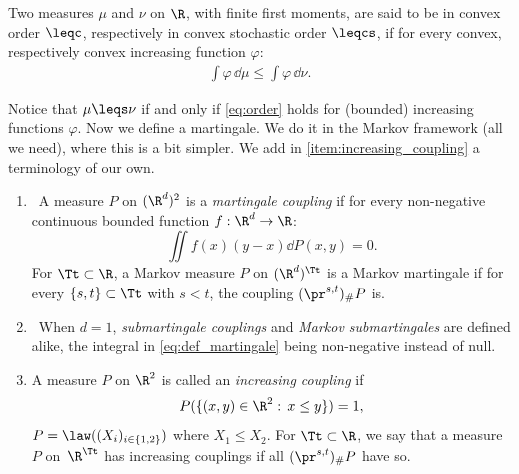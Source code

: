 \begin{defi}\label{defi:leqc}Two measures $\mu$ and $\nu$ on $\R$, with finite first moments, are said to be in convex order $\leqc$, respectively in convex stochastic order $\leqcs$, if for every convex, respectively convex increasing function $\varphi$:
\begin{align}\label{eq:order}
\int \varphi\, \dd \mu\leq \int \varphi\, \dd \nu.
\end{align}
\end{defi}

Notice that $\mu\leqs\nu$ if and only if \eqref{eq:order} holds for (bounded) increasing functions $\varphi$. Now we define a martingale. We do it in the Markov framework (all we need), where this is a bit simpler. We add in \eqref{item:increasing_coupling} a terminology of our own.

\skpt
\begin{defi}\label{defi:martingale}
\begin{enumerate}
\item
\label{item:martingale}\ A measure $P$ on $(\R^d)^2$ is a \emph{martingale coupling} if for every non-negative continuous bounded function $f:\R^d\to \R$:
\begin{equation}\label{eq:def_martingale}\iint f(x)(y-x) \dd P(x,y)=0.
\end{equation}
For $\Tt\subset\R$, a Markov measure $P$ on $(\R^d)^{\Tt}$ is a Markov martingale if for every $\{s,t\}\subset\Tt$ with $s<t$, the coupling $(\pr^{s,t})_\#P$ is.

\item\label{item:sousmartingale}\ When $d=1$, \emph{submartingale couplings} and \emph{Markov submartingales} are defined alike, the integral in \eqref{eq:def_martingale} being non-negative instead of null.

\item\label{item:increasing_coupling} A measure $P$ on $\R^2$ is called an \emph{increasing coupling} if
\[
P(\{(x,y)\in \R^2:\,x\leq y\})=1,
\]
\ie $P=\law((X_i)_{i\in\{1,2\}})$ where $X_1\leq X_2$. For $\Tt\subset\R$, we say that a measure $P$ on~$\R^\Tt$ has increasing couplings if all $(\pr^{s,t})_\#P$ have so.
\end{enumerate}
\end{defi}


